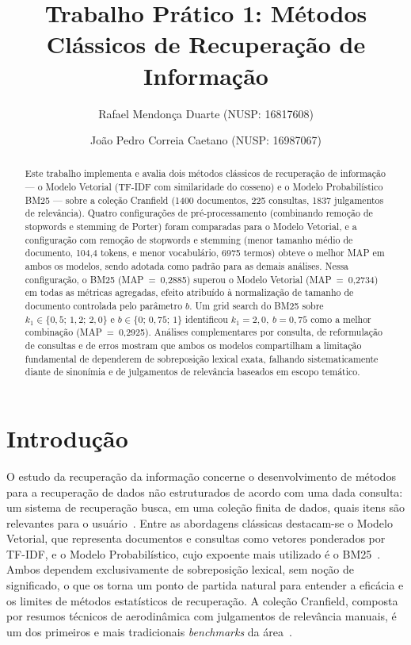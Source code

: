 \documentclass[runningheads]{llncs}
\begin{document}
%
\title{Trabalho Prático 1: Métodos Clássicos de Recuperação de Informação}
%
\author{Rafael Mendonça Duarte (NUSP: 16817608) \and
        João Pedro Correia Caetano (NUSP: 16987067)}
%
%
%
\maketitle
%
\begin{abstract}
Este trabalho implementa e avalia dois métodos clássicos de recuperação de informação --- o Modelo Vetorial (TF-IDF com similaridade do cosseno) e o Modelo Probabilístico BM25 --- sobre a coleção Cranfield (1400 documentos, 225 consultas, 1837 julgamentos de relevância). Quatro configurações de pré-processamento (combinando remoção de stopwords e stemming de Porter) foram comparadas para o Modelo Vetorial, e a configuração com remoção de stopwords e stemming (menor tamanho médio de documento, 104{,}4 tokens, e menor vocabulário, 6975 termos) obteve o melhor MAP em ambos os modelos, sendo adotada como padrão para as demais análises. Nessa configuração, o BM25 (MAP~=~0{,}2885) superou o Modelo Vetorial (MAP~=~0{,}2734) em todas as métricas agregadas, efeito atribuído à normalização de tamanho de documento controlada pelo parâmetro $b$. Um grid search do BM25 sobre $k_1 \in \{0{,}5;\,1{,}2;\,2{,}0\}$ e $b \in \{0;\,0{,}75;\,1\}$ identificou $k_1=2{,}0,\ b=0{,}75$ como a melhor combinação (MAP~=~0{,}2925). Análises complementares por consulta, de reformulação de consultas e de erros mostram que ambos os modelos compartilham a limitação fundamental de dependerem de sobreposição lexical exata, falhando sistematicamente diante de sinonímia e de julgamentos de relevância baseados em escopo temático.

\end{abstract}
%
\section{Introdução}

O estudo da recuperação da informação concerne o desenvolvimento de métodos para a recuperação de dados não estruturados de acordo com uma dada consulta: um sistema de recuperação busca, em uma coleção finita de dados, quais itens são relevantes para o usuário~\cite{ref_manning}. Entre as abordagens clássicas destacam-se o Modelo Vetorial, que representa documentos e consultas como vetores ponderados por TF-IDF, e o Modelo Probabilístico, cujo expoente mais utilizado é o BM25~\cite{ref_bm25}. Ambos dependem exclusivamente de sobreposição lexical, sem noção de significado, o que os torna um ponto de partida natural para entender a eficácia e os limites de métodos estatísticos de recuperação. A coleção Cranfield, composta por resumos técnicos de aerodinâmica com julgamentos de relevância manuais, é um dos primeiros e mais tradicionais \emph{benchmarks} da área~\cite{ref_irdatasets}.
\end{document}
